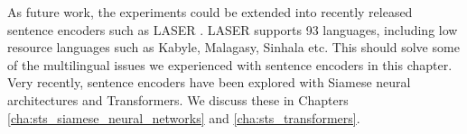 As future work, the experiments could be extended into recently released sentence encoders such as LASER \autocite{10.1162/tacl_a_00288}. LASER supports 93 languages, including low resource languages such as Kabyle, Malagasy, Sinhala etc. This should solve some of the multilingual issues we experienced with sentence encoders in this chapter. Very recently, sentence encoders have been explored with Siamese neural architectures and  Transformers. We discuss these in Chapters \ref{cha:sts_siamese_neural_networks} and \ref{cha:sts_transformers}. 
